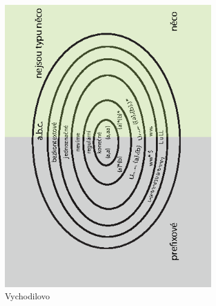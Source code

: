 \documentclass[10pt, a4paper, titlepage]{article}
\theoremstyle{note}
\begin{document}
\begin{figure}[ht]
\centering\includegraphics[width=9cm]{vajicko-3.eps}
\caption{Vychodilovo }\label{vajicko-2}
\end{figure}


\renewcommand{\indexcolumns}{3}
\printindex
\end{document}
